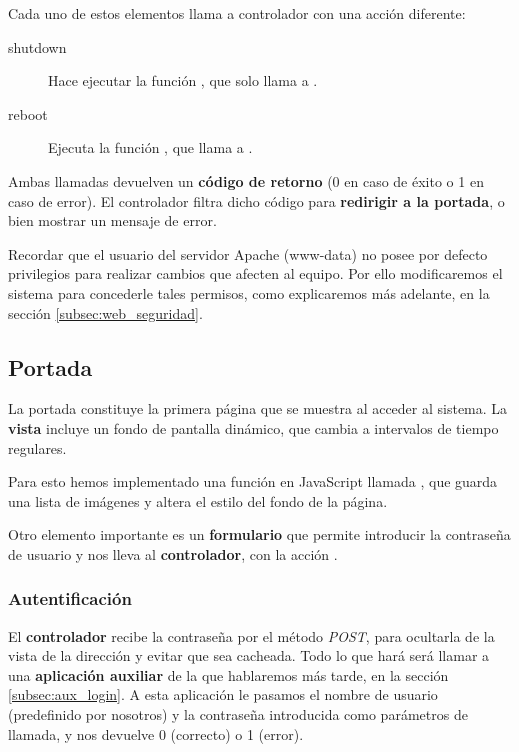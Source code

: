 \smallskip

Cada uno de estos elementos llama a controlador con una acción diferente:

\begin{description}
	\item[shutdown] Hace ejecutar la función , que solo llama a .

	\item[reboot] Ejecuta la función , que llama a .
\end{description}

Ambas llamadas devuelven un \textbf{código de retorno} (0 en caso de éxito o 1 en caso de error). El controlador filtra dicho código para \textbf{redirigir a la portada}, o bien mostrar un mensaje de error.

Recordar que el usuario del servidor Apache (www-data) no posee por defecto privilegios para realizar cambios que afecten al equipo. Por ello modificaremos el sistema para concederle tales permisos, como explicaremos más adelante, en la sección \ref{subsec:web_seguridad}.

\subsection{Portada}

La portada constituye la primera página que se muestra al acceder al sistema. La \textbf{vista} incluye un fondo de pantalla dinámico, que cambia a intervalos de tiempo regulares.

Para esto hemos implementado una función en JavaScript llamada , que guarda una lista de imágenes y altera el estilo del fondo de la página.

Otro elemento importante es un \textbf{formulario} que permite introducir la contraseña de usuario y nos lleva al \textbf{controlador}, con la acción .

\subsubsection{Autentificación}

El \textbf{controlador} recibe la contraseña por el método \textit{POST}, para ocultarla de la vista de la dirección y evitar que sea cacheada. Todo lo que hará será llamar a una \textbf{aplicación auxiliar} de la que hablaremos más tarde, en la sección \ref{subsec:aux_login}. A esta aplicación le pasamos el nombre de usuario (predefinido por nosotros) y la contraseña introducida como parámetros de llamada, y nos devuelve 0 (correcto) o 1 (error).


